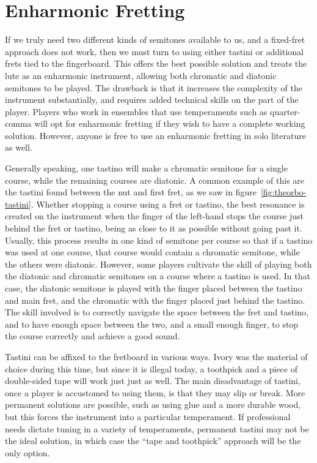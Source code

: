 \section{Enharmonic Fretting}

If we truly need two different kinds of semitones available to us, and a fixed-fret
approach does not work, then we must turn to using either tastini or additional frets
tied to the fingerboard.  This offers the best possible solution and treats the lute as
an enharmonic instrument, allowing both chromatic and diatonic semitones to be
played. The drawback is that it increases the complexity of the instrument substantially,
and requires added technical skills on the part of the player. Players who work in
ensembles that use temperaments such as quarter-comma will opt for enharmonic fretting
if they wish to have a complete working solution. However, anyone is free to use an
enharmonic fretting in solo literature as well.

Generally speaking, one tastino will make a chromatic semitone for a single course, while the
remaining courses are diatonic.  A common example of this are the tastini found between the nut and
first fret, as we saw in figure~\ref{fig:theorbo-tastini}. Whether stopping a course using a fret or
tastino, the best resonance is created on the instrument when the finger of the left-hand stops the
course just behind the fret or tastino, being as close to it as possible without going past it.
Usually, this process results in one kind of semitone per course so that if a tastino was used at
one course, that course would contain a chromatic semitone, while the others were diatonic.
However, some players cultivate the skill of playing both the diatonic and chromatic semitones on a
course where a tastino is used. In that case, the diatonic semitone is played with the finger placed
between the tastino and main fret, and the chromatic with the finger placed just behind the
tastino.  The skill involved is to correctly navigate the space between the fret and tastino, and to
have enough space between the two, and a small enough finger, to stop the course correctly and
achieve a good sound.

Tastini can be affixed to the fretboard in various ways. Ivory was the material of choice during
this time, but since it is illegal today, a toothpick and a piece of double-sided tape  will work
just just as well.  The main disadvantage of tastini, once a player is accustomed to using them, is
that they may slip or break.  More permanent solutions are possible, such as using glue and a more
durable wood, but this forces the instrument into a particular temperament.  If professional needs
dictate tuning in a variety of temperaments, permanent tastini may not be the ideal solution, in
which case the ``tape and toothpick'' approach will be the only option.


